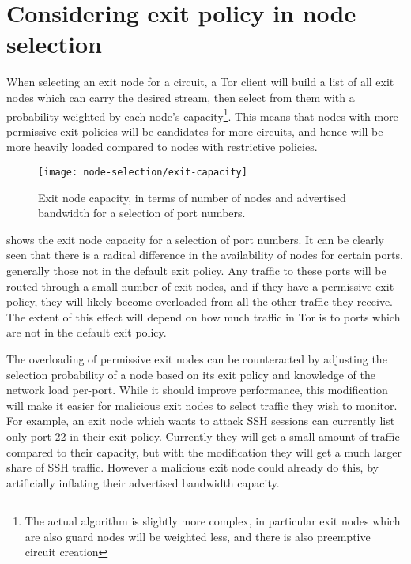 \documentclass{article}
\title{\thetitle}
\author{Steven J. Murdoch}
\begin{document}
\thispagestyle{plain}
 
\maketitle

\section{Considering exit policy in node selection}

When selecting an exit node for a circuit, a Tor client will build a list of all exit nodes which can carry the desired stream, then select from them with a probability weighted by each node's capacity\footnote{The actual algorithm is slightly more complex, in particular exit nodes which are also guard nodes will be weighted less, and there is also preemptive circuit creation}.
This means that nodes with more permissive exit policies will be candidates for more circuits, and hence will be more heavily loaded compared to nodes with restrictive policies.

\begin{figure}
\texttt{[image: node-selection/exit-capacity]}
\caption{Exit node capacity, in terms of number of nodes and advertised bandwidth for a selection of port numbers.}
\label{fig:exit-capacity}
\end{figure}

 shows the exit node capacity for a selection of port numbers.
It can be clearly seen that there is a radical difference in the availability of nodes for certain ports, generally those not in the default exit policy.
Any traffic to these ports will be routed through a small number of exit nodes, and if they have a permissive exit policy, they will likely become overloaded from all the other traffic they receive.
The extent of this effect will depend on how much traffic in Tor is to ports which are not in the default exit policy.

The overloading of permissive exit nodes can be counteracted by adjusting the selection probability of a node based on its exit policy and knowledge of the network load per-port.
While it should improve performance, this modification will make it easier for malicious exit nodes to select traffic they wish to monitor.
For example, an exit node which wants to attack SSH sessions can currently list only port 22 in their exit policy.
Currently they will get a small amount of traffic compared to their capacity, but with the modification they will get a much larger share of SSH traffic.
However a malicious exit node could already do this, by artificially inflating their advertised bandwidth capacity.
\end{document}
